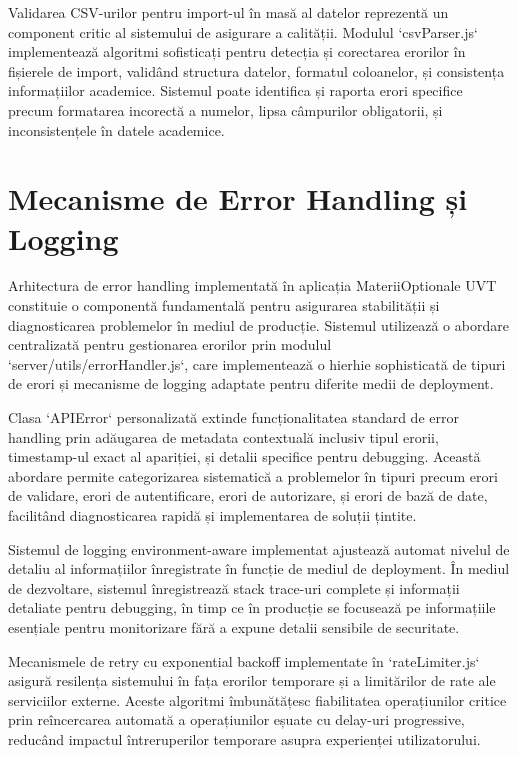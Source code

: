 \documentclass[12pt,a4paper]{report}
\begin{document}
Validarea CSV-urilor pentru import-ul în masă al datelor reprezentă un component critic al sistemului de asigurare a calității. Modulul `csvParser.js` implementează algoritmi sofisticați pentru detecția și corectarea erorilor în fișierele de import, validând structura datelor, formatul coloanelor, și consistența informațiilor academice. Sistemul poate identifica și raporta erori specifice precum formatarea incorectă a numelor, lipsa câmpurilor obligatorii, și inconsistențele în datele academice.

\section{Mecanisme de Error Handling și Logging}

Arhitectura de error handling implementată în aplicația MateriiOptionale UVT constituie o componentă fundamentală pentru asigurarea stabilității și diagnosticarea problemelor în mediul de producție. Sistemul utilizează o abordare centralizată pentru gestionarea erorilor prin modulul `server/utils/errorHandler.js`, care implementează o hierhie sophisticată de tipuri de erori și mecanisme de logging adaptate pentru diferite medii de deployment.

Clasa `APIError` personalizată extinde funcționalitatea standard de error handling prin adăugarea de metadata contextuală inclusiv tipul erorii, timestamp-ul exact al apariției, și detalii specifice pentru debugging. Această abordare permite categorizarea sistematică a problemelor în tipuri precum erori de validare, erori de autentificare, erori de autorizare, și erori de bază de date, facilitând diagnosticarea rapidă și implementarea de soluții țintite.

Sistemul de logging environment-aware implementat ajustează automat nivelul de detaliu al informațiilor înregistrate în funcție de mediul de deployment. În mediul de dezvoltare, sistemul înregistrează stack trace-uri complete și informații detaliate pentru debugging, în timp ce în producție se focusează pe informațiile esențiale pentru monitorizare fără a expune detalii sensibile de securitate.

Mecanismele de retry cu exponential backoff implementate în `rateLimiter.js` asigură resilența sistemului în fața erorilor temporare și a limitărilor de rate ale serviciilor externe. Aceste algoritmi îmbunătățesc fiabilitatea operațiunilor critice prin reîncercarea automată a operațiunilor eșuate cu delay-uri progressive, reducând impactul întreruperilor temporare asupra experienței utilizatorului.
\end{document}
